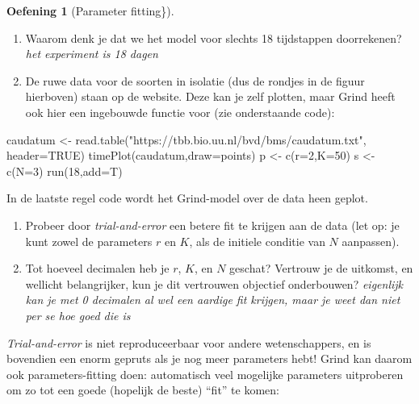 \documentclass[
  a4paper,
]{scrbook}
\newenvironment{Shaded}{\begin{snugshade}}{\end{snugshade}}
\newcommand{\AttributeTok}[1]{\textcolor[rgb]{0.40,0.45,0.13}{#1}}
\newcommand{\ConstantTok}[1]{\textcolor[rgb]{0.56,0.35,0.01}{#1}}
\newcommand{\DecValTok}[1]{\textcolor[rgb]{0.68,0.00,0.00}{#1}}
\newcommand{\FunctionTok}[1]{\textcolor[rgb]{0.28,0.35,0.67}{#1}}
\newcommand{\NormalTok}[1]{\textcolor[rgb]{0.00,0.23,0.31}{#1}}
\newcommand{\OtherTok}[1]{\textcolor[rgb]{0.00,0.23,0.31}{#1}}
\newcommand{\StringTok}[1]{\textcolor[rgb]{0.13,0.47,0.30}{#1}}
\providecommand{\tightlist}{%
  \setlength{\itemsep}{0pt}\setlength{\parskip}{0pt}}\usepackage{longtable,booktabs,array}
\theoremstyle{definition}
\newtheorem{exercise}{Oefening}[chapter]
\theoremstyle{remark}
\begin{document}
\begin{exercise}[Parameter
fitting\}]
\begin{enumerate}
\def\labelenumi{\alph{enumi}.}
\tightlist
\item
  Waarom denk je dat we het model voor slechts 18 tijdstappen
  doorrekenen? \emph{het experiment is 18 dagen}
\item
  De ruwe data voor de soorten in isolatie (dus de rondjes in de figuur
  hierboven) staan op de website. Deze kan je zelf plotten, maar Grind
  heeft ook hier een ingebouwde functie voor (zie onderstaande code):
\end{enumerate}

\begin{Shaded}
\begin{Highlighting}[]
\NormalTok{  caudatum }\OtherTok{\textless{}{-}} \FunctionTok{read.table}\NormalTok{(}\StringTok{"https://tbb.bio.uu.nl/bvd/bms/caudatum.txt"}\NormalTok{, }\AttributeTok{header=}\ConstantTok{TRUE}\NormalTok{)}
  \FunctionTok{timePlot}\NormalTok{(caudatum,}\AttributeTok{draw=}\NormalTok{points)}
\NormalTok{  p }\OtherTok{\textless{}{-}} \FunctionTok{c}\NormalTok{(}\AttributeTok{r=}\DecValTok{2}\NormalTok{,}\AttributeTok{K=}\DecValTok{50}\NormalTok{)   }
\NormalTok{  s }\OtherTok{\textless{}{-}} \FunctionTok{c}\NormalTok{(}\AttributeTok{N=}\DecValTok{3}\NormalTok{)}
  \FunctionTok{run}\NormalTok{(}\DecValTok{18}\NormalTok{,}\AttributeTok{add=}\NormalTok{T)}
\end{Highlighting}
\end{Shaded}

In de laatste regel code wordt het Grind-model over de data heen geplot.

\begin{enumerate}
\def\labelenumi{\alph{enumi}.}
\setcounter{enumi}{2}
\tightlist
\item
  Probeer door \emph{trial-and-error} een betere fit te krijgen aan de
  data (let op: je kunt zowel de parameters \(r\) en \(K\), als de
  initiele conditie van \(N\) aanpassen).
\item
  Tot hoeveel decimalen heb je \(r\), \(K\), en \(N\) geschat? Vertrouw
  je de uitkomst, en wellicht belangrijker, kun je dit vertrouwen
  objectief onderbouwen? \emph{eigenlijk kan je met 0 decimalen al wel
  een aardige fit krijgen, maar je weet dan niet per se hoe goed die is}
\end{enumerate}

\emph{Trial-and-error} is niet reproduceerbaar voor andere
wetenschappers, en is bovendien een enorm gepruts als je nog meer
parameters hebt! Grind kan daarom ook parameters-fitting doen:
automatisch veel mogelijke parameters uitproberen om zo tot een goede
(hopelijk de beste) ``fit'' te komen:


\end{exercise}
\end{document}
